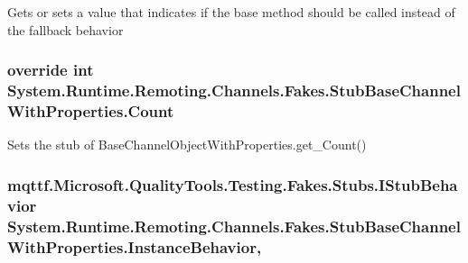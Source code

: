 Gets or sets a value that indicates if the base method should be called instead of the fallback behavior

\hypertarget{class_system_1_1_runtime_1_1_remoting_1_1_channels_1_1_fakes_1_1_stub_base_channel_with_properties_a5820430210b2b8734148e5ee502fed4d}{
\subsubsection[{Count}]{\setlength{\rightskip}{0pt plus 5cm}override int System.\-Runtime.\-Remoting.\-Channels.\-Fakes.\-Stub\-Base\-Channel\-With\-Properties.\-Count\hspace{0.3cm}{\ttfamily [get]}}}\label{class_system_1_1_runtime_1_1_remoting_1_1_channels_1_1_fakes_1_1_stub_base_channel_with_properties_a5820430210b2b8734148e5ee502fed4d}


Sets the stub of Base\-Channel\-Object\-With\-Properties.\-get\-\_\-\-Count()

\hypertarget{class_system_1_1_runtime_1_1_remoting_1_1_channels_1_1_fakes_1_1_stub_base_channel_with_properties_a0529aba6aa54e72474a4a9b9875bbb6b}{
\subsubsection[{Instance\-Behavior}]{\setlength{\rightskip}{0pt plus 5cm}mqttf.\-Microsoft.\-Quality\-Tools.\-Testing.\-Fakes.\-Stubs.\-I\-Stub\-Behavior System.\-Runtime.\-Remoting.\-Channels.\-Fakes.\-Stub\-Base\-Channel\-With\-Properties.\-Instance\-Behavior\hspace{0.3cm}{\ttfamily [get]}, {\ttfamily [set]}}}\label{class_system_1_1_runtime_1_1_remoting_1_1_channels_1_1_fakes_1_1_stub_base_channel_with_properties_a0529aba6aa54e72474a4a9b9875bbb6b}


